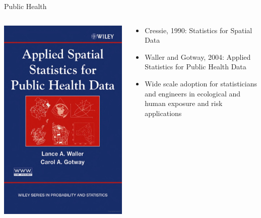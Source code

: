 \documentclass[
  ignorenonframetext,
]{beamer}
\begin{document}
\begin{frame}{Public Health}
\label{public-health}
\begin{columns}[T]
\begin{column}{0.4\textwidth}
\includegraphics{../../presentations/20240222_UNC_ESE_Guest_Lecture/book-cover.jpeg}
\end{column}

\begin{column}{0.6\textwidth}
\begin{itemize}
\item
  Cressie, 1990: Statistics for Spatial Data
\item
  Waller and Gotway, 2004: Applied Statistics for Public Health Data
\item
  Wide scale adoption for statisticians and engineers in ecological and
  human exposure and risk applications
\end{itemize}
\end{column}
\end{columns}
\end{frame}
\end{document}
